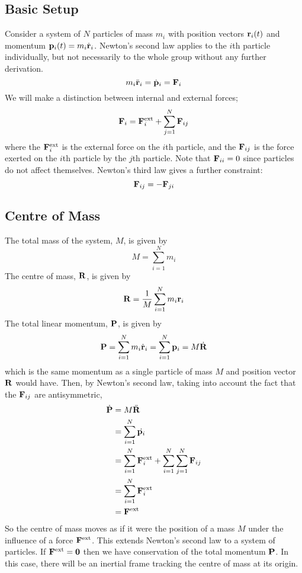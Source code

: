 \subsection{Basic Setup}
Consider a system of \(N\) particles of mass \(m_i\) with position vectors \(\vb r_i(t)\) and momentum \(\vb p_i(t) = m_i \dot {\vb r}_i\). Newton's second law applies to the \(i\)th particle individually, but not necessarily to the whole group without any further derivation.
\[ m_i \ddot{\vb{r}}_i = \dot{\vb p}_i = \vb F_i \]
We will make a distinction between internal and external forces;
\[ \vb F_i = \vb F_i^\text{ext} + \sum_{j = 1}^N \vb F_{ij} \]
where the \(\vb F_i^\text{ext}\) is the external force on the \(i\)th particle, and the \(\vb F_{ij}\) is the force exerted on the \(i\)th particle by the \(j\)th particle. Note that \(\vb F_{ii} = 0\) since particles do not affect themselves. Newton's third law gives a further constraint:
\[ \vb F_{ij} = -\vb F_{ji} \]

\subsection{Centre of Mass}
The total mass of the system, \(M\), is given by
\[ M = \sum_{i=1}^N m_i \]
The centre of mass, \(\vb R\), is given by
\[ \vb R = \frac{1}{M} \sum_{i=1}^N m_i \vb r_i \]
The total linear momentum, \(\vb P\), is given by
\[ \vb P = \sum_{i=1}^N m_i \dot{\vb{r}}_i = \sum_{i=1}^N \vb p_i = M\dot{\vb R} \]
which is the same momentum as a single particle of mass \(M\) and position vector \(\vb R\) would have. Then, by Newton's second law, taking into account the fact that the \(\vb F_{ij}\) are antisymmetric,
\begin{align*}
	\dot{\vb P} & = M \ddot{\vb R}                                                         \\
	            & = \sum_{i=1}^N \dot{\vb p_i}                                             \\
	            & = \sum_{i=1}^N \vb F_i^\text{ext} + \sum_{i=1}^N \sum_{j=1}^N \vb F_{ij} \\
	            & = \sum_{i=1}^N \vb F_i^\text{ext}                                        \\
	            & = \vb F^\text{ext}
\end{align*}
So the centre of mass moves as if it were the position of a mass \(M\) under the influence of a force \(\vb F^\text{ext}\). This extends Newton's second law to a system of particles. If \(\vb F^\text{ext} = \vb 0\) then we have conservation of the total momentum \(\vb P\). In this case, there will be an inertial frame tracking the centre of mass at its origin.

